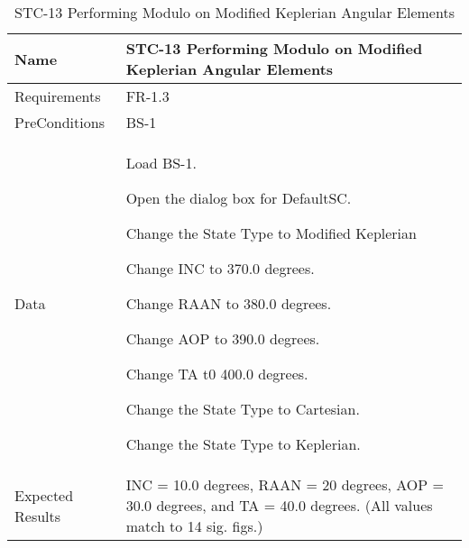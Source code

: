 
\begin{table}[htbp!]
\centering
      \begin{tabular}{|p{1.05 in} |p{4.75 in} |}
      \hline
         \rowcolor[rgb]{0.8,0.8,0.8} Name & STC-13 Performing Modulo on Modified Keplerian Angular Elements\\
         \hline
         Requirements & FR-1.3\\  \hline
         PreConditions & BS-1\\     \hline
         Data &
         \begin{compactenum}
             \item Load BS-1.
             \item Open the dialog box for DefaultSC.
             \item Change the State Type to Modified Keplerian
             \item Change INC to 370.0 degrees.
             \item Change RAAN to 380.0 degrees.
             \item Change AOP to 390.0 degrees.
             \item Change TA t0 400.0 degrees.
             \item Change the State Type to Cartesian.
             \item Change the State Type to Keplerian.
         \end{compactenum}
         \\ \hline
         Expected Results & INC = 10.0 degrees, RAAN = 20 degrees, AOP = 30.0 degrees, and TA = 40.0 degrees. (All
         values match to 14 sig. figs.)\\
      \hline
      \end{tabular}
      \label{Table:STC-13}
      \caption{STC-13 Performing Modulo on Modified Keplerian Angular Elements}
\end{table} 